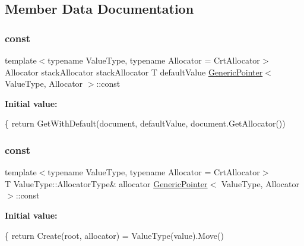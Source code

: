 \subsection{Member Data Documentation}
\mbox{\label{classGenericPointer_ad6e06cd83cf52e045c7e07a67078e973}} 
\subsubsection{\texorpdfstring{const}{const}\hspace{0.1cm}{\footnotesize\ttfamily [1/3]}}
{\footnotesize\ttfamily template$<$typename Value\+Type, typename Allocator = Crt\+Allocator$>$ \\
Allocator stack\+Allocator stack\+Allocator T default\+Value \hyperlink{classGenericPointer}{Generic\+Pointer}$<$ Value\+Type, Allocator $>$\+::const}

{\bfseries Initial value\+:}
\begin{DoxyCode}
\{
        \textcolor{keywordflow}{return} GetWithDefault(document, defaultValue, document.GetAllocator())
\end{DoxyCode}
\mbox{\label{classGenericPointer_ace82428d4ad958b05a52480d949b32fa}} 
\subsubsection{\texorpdfstring{const}{const}\hspace{0.1cm}{\footnotesize\ttfamily [2/3]}}
{\footnotesize\ttfamily template$<$typename Value\+Type, typename Allocator = Crt\+Allocator$>$ \\
T Value\+Type\+::\+Allocator\+Type\& allocator \hyperlink{classGenericPointer}{Generic\+Pointer}$<$ Value\+Type, Allocator $>$\+::const}

{\bfseries Initial value\+:}
\begin{DoxyCode}
\{
        \textcolor{keywordflow}{return} Create(root, allocator) = ValueType(value).Move()
\end{DoxyCode}
\mbox{\label{classGenericPointer_abb1b141cfe93b7159842b5cad60d1be3}} 
